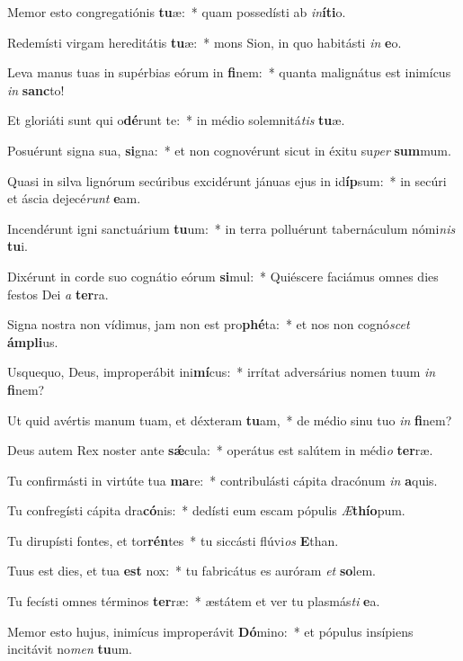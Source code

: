 \item Memor esto congregatiónis \textbf{tu}æ:~* quam possedísti ab \textit{in}\textbf{í}\textbf{ti}o.
\item Redemísti virgam hereditátis \textbf{tu}æ:~* mons Sion, in quo habitásti \textit{in} \textbf{e}o.
\item Leva manus tuas in supérbias eórum in \textbf{fi}nem:~* quanta malignátus est inimícus \textit{in} \textbf{sanc}to!
\item Et gloriáti sunt qui o\textbf{dé}runt te:~* in médio solemnitá\textit{tis} \textbf{tu}æ.
\item Posuérunt signa sua, \textbf{si}gna:~* et non cognovérunt sicut in éxitu su\textit{per} \textbf{sum}mum.
\item Quasi in silva lignórum secúribus excidérunt jánuas ejus in id\textbf{íp}sum:~* in secúri et áscia dejecé\textit{runt} \textbf{e}am.
\item Incendérunt igni sanctuárium \textbf{tu}um:~* in terra polluérunt tabernáculum nómi\textit{nis} \textbf{tu}i.
\item Dixérunt in corde suo cognátio eórum \textbf{si}mul:~* Quiéscere faciámus omnes dies festos Dei \textit{a} \textbf{ter}ra.
\item Signa nostra non vídimus, jam non est pro\textbf{phé}ta:~* et nos non cognó\textit{scet} \textbf{ám}\textbf{pli}us.
\item Usquequo, Deus, improperábit ini\textbf{mí}cus:~* irrítat adversárius nomen tuum \textit{in} \textbf{fi}nem?
\item Ut quid avértis manum tuam, et déxteram \textbf{tu}am,~* de médio sinu tuo \textit{in} \textbf{fi}nem?
\item Deus autem Rex noster ante \textbf{sǽ}cula:~* operátus est salútem in médi\textit{o} \textbf{ter}ræ.
\item Tu confirmásti in virtúte tua \textbf{ma}re:~* contribulásti cápita dracónum \textit{in} \textbf{a}quis.
\item Tu confregísti cápita dra\textbf{có}nis:~* dedísti eum escam pópulis \textit{Æ}\textbf{thí}\textbf{o}pum.
\item Tu dirupísti fontes, et tor\textbf{rén}tes~* tu siccásti flúvi\textit{os} \textbf{E}than.
\item Tuus est dies, et tua \textbf{est} nox:~* tu fabricátus es auróram \textit{et} \textbf{so}lem.
\item Tu fecísti omnes términos \textbf{ter}ræ:~* æstátem et ver tu plasmás\textit{ti} \textbf{e}a.
\item Memor esto hujus, inimícus improperávit \textbf{Dó}mino:~* et pópulus insípiens incitávit no\textit{men} \textbf{tu}um.
